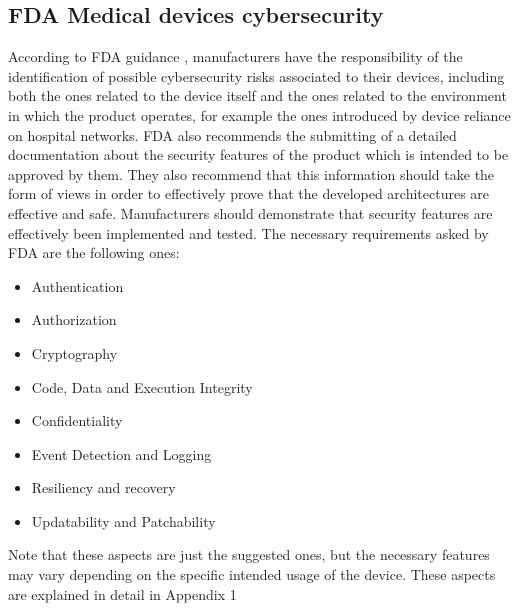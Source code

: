 \documentclass{Configuration_Files/PoliMi3i_thesis}
\begin{document}
\subsection{FDA Medical devices cybersecurity }


According to FDA guidance \cite{healthCybersecurityMedicalDevices2023}, manufacturers have the responsibility of the identification of possible cybersecurity risks associated to their devices, including both the ones related to the device itself and the ones related to the environment in which the product operates, for example the ones introduced by device reliance on hospital networks.
FDA also recommends the submitting of a detailed documentation about the security features of the product which is intended to be approved by them. They also recommend that this information should take the form of views in order to effectively prove that the developed architectures are effective and safe. Manufacturers should demonstrate that security features are effectively been implemented and tested.
The necessary requirements asked by FDA are the following ones:
\begin{itemize}
	\item Authentication
	\item Authorization
	\item Cryptography 
	\item Code, Data and Execution Integrity
	\item Confidentiality
	\item Event Detection and Logging
	\item Resiliency and recovery
	\item Updatability and Patchability
\end{itemize}
Note that these aspects are just the suggested ones, but the necessary features may vary depending on the specific intended usage of the device.
These aspects are explained in detail in Appendix 1
\end{document}
